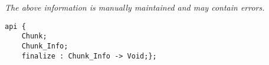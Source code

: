 \label{api:Finalized\_Chunk}

{\tiny \it The above information is manually maintained and may contain errors.}
\begin{verbatim}
api {
    Chunk;
    Chunk_Info;
    finalize : Chunk_Info -> Void;};
\end{verbatim}
